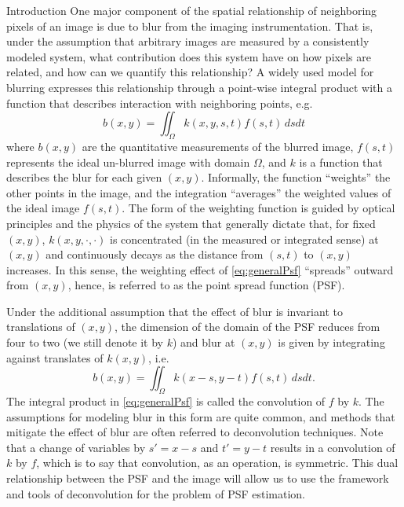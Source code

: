 \begin{chapter}{Introduction}
  One major component of the spatial relationship of neighboring pixels of an image is due to blur from the imaging instrumentation.
  That is, under the assumption that arbitrary images are measured by a consistently modeled system, what contribution does this system have on how pixels are related, and how can we quantify this relationship?
  A widely used model for blurring \citep{hansen2006,jain1989,vogel2002,andOthers} expresses this relationship through a point-wise integral product with a function that describes interaction with neighboring points, e.g.
  \begin{equation}\label{eq:generalPsf}
    b(x,y) = \iint_{\Omega} k(x,y,s,t) f(s,t)\,dsdt
  \end{equation}
  where $b(x,y)$ are the quantitative measurements of the blurred image, $f(s,t)$ represents the ideal un-blurred image with domain $\Omega$, and $k$ is a function that describes the blur for each given $(x,y)$.
  Informally, the function ``weights'' the other points in the image, and the integration ``averages'' the weighted values of the ideal image $f(s,t)$.
  The form of the weighting function is guided by optical principles and the physics of the system that generally dictate that, for fixed $(x,y)$, $k(x,y,\cdot,\cdot)$ is concentrated (in the measured or integrated sense) at $(x,y)$ and continuously decays as the distance from $(s,t)$ to $(x,y)$ increases.
  In this sense, the weighting effect of \eqref{eq:generalPsf} ``spreads'' outward from $(x,y)$, hence, is referred to as the point spread function (PSF).

  Under the additional assumption that the effect of blur is invariant to translations of $(x,y)$, the dimension of the domain of the PSF reduces from four to two (we still denote it by $k$) and 
blur at $(x,y)$ is given by integrating against translates of $k(x,y)$, i.e.
\begin{equation}\label{eq:convolutionDeterministic}
  b(x,y) = \iint_{\Omega} k(x-s,y-t) f(s,t)\,dsdt.
\end{equation}
  The integral product in \eqref{eq:generalPsf} is called the convolution of $f$ by $k$.
  The assumptions for modeling blur in this form are quite common, and methods that mitigate the effect of blur are often referred to deconvolution techniques.
  Note that a change of variables by $s'=x-s$ and $t'=y-t$ results in a convolution of $k$ by $f$, which is to say that convolution, as an operation, is symmetric.
  This dual relationship between the PSF and the image will allow us to use the framework and tools of deconvolution for the problem of PSF estimation.


\end{chapter}
